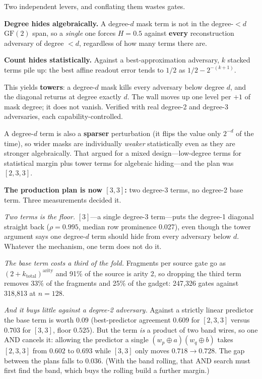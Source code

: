 \documentclass[11pt]{article}
\newcommand{\xor}{\oplus}
\begin{document}
Two independent levers, and conflating them wastes gates.

\textbf{Degree hides algebraically.} A degree-$d$ mask term is not in the
degree-$<d$ $\mathrm{GF}(2)$ span, so a \emph{single} one forces $H=0.5$ against
\textbf{every} reconstruction adversary of degree $<d$, regardless of how many
terms there are.

\textbf{Count hides statistically.} Against a best-approximation adversary, $k$
stacked terms pile up: the best affine readout error tends to $1/2$ as
$1/2-2^{-(k+1)}$.

This yields \textbf{towers}: a degree-$d$ mask kills every adversary below
degree $d$, and the diagonal returns at degree exactly $d$. The wall moves up
one level per $+1$ of mask degree; it does not vanish. Verified with real
degree-2 and degree-3 adversaries, each capability-controlled.

A degree-$d$ term is also a \textbf{sparser} perturbation (it flips the value
only $2^{-d}$ of the time), so wider masks are individually \emph{weaker}
statistically even as they are stronger algebraically. That argued for a mixed
design---low-degree terms for statistical margin plus tower terms for algebraic
hiding---and the plan was $[2,3,3]$.

\textbf{The production plan is now $[3,3]$:} two degree-3 terms, no degree-2
base term. Three measurements decided it.

\emph{Two terms is the floor.} $[3]$---a single degree-3 term---puts the
degree-1 diagonal straight back ($\rho = 0.995$, median row prominence 0.027),
even though the tower argument says one degree-$d$ term should hide from every
adversary below $d$. Whatever the mechanism, one term does not do it.

\emph{The base term costs a third of the fold.} Fragments per source gate go as
$(2+k_{\mathrm{total}})^{\mathrm{arity}}$ and 91\% of the source is arity 2, so
dropping the third term removes 33\% of the fragments and 25\% of the gadget:
247{,}326 gates against 318{,}813 at $n{=}128$.

\emph{And it buys little against a degree-2 adversary.} Against a strictly
linear predictor the base term is worth $0.09$ (best-predictor agreement
$0.609$ for $[2,3,3]$ versus $0.703$ for $[3,3]$, floor $0.525$). But the term
\emph{is} a product of two band wires, so one AND cancels it: allowing the
predictor a single $(w_p\xor a)(w_q\xor b)$ takes $[2,3,3]$ from $0.602$ to
$0.693$ while $[3,3]$ only moves $0.718 \to 0.728$. The gap between the plans
falls to $0.036$. (With the band rolling, that AND search must first find the
band, which buys the rolling build a further margin.)
\end{document}
